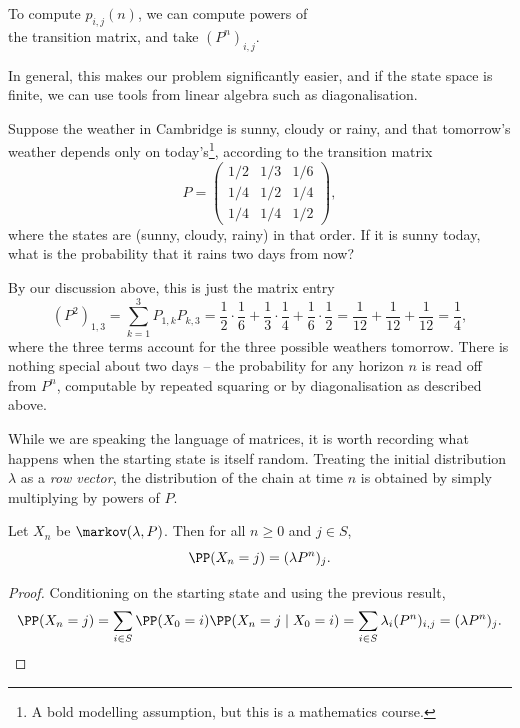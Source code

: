 \documentclass[a4paper]{scrartcl}
\begin{document}
\begin{center}
	\color{blue}
	To compute $p_{i, j}(n)$, we can compute powers of\\ the transition matrix, and take $(P^n)_{i, j}$.
\end{center}

In general, this makes our problem significantly easier, and if the state space is finite, we can use tools from linear algebra such as diagonalisation.

\begin{example}
	Suppose the weather in Cambridge is sunny, cloudy or rainy, and that tomorrow's weather depends only on today's\footnote{A bold modelling assumption, but this is a mathematics course.}, according to the transition matrix
	$$
	P = \begin{pmatrix}
		1/2 & 1/3 & 1/6 \\
		1/4 & 1/2 & 1/4 \\
		1/4 & 1/4 & 1/2
	\end{pmatrix},
	$$
	where the states are (sunny, cloudy, rainy) in that order. If it is sunny today, what is the probability that it rains two days from now?

	By our discussion above, this is just the matrix entry
	$$
	(P^2)_{1, 3} = \sum_{k = 1}^{3} P_{1, k}P_{k, 3} = \frac{1}{2}\cdot\frac{1}{6} + \frac{1}{3}\cdot\frac{1}{4} + \frac{1}{6}\cdot\frac{1}{2} = \frac{1}{12} + \frac{1}{12} + \frac{1}{12} = \frac{1}{4},
	$$
	where the three terms account for the three possible weathers tomorrow. There is nothing special about two days -- the probability for any horizon $n$ is read off from $P^n$, computable by repeated squaring or by diagonalisation as described above.
\end{example}

While we are speaking the language of matrices, it is worth recording what happens when the starting state is itself random. Treating the initial distribution $\lambda$ as a \emph{row vector}, the distribution of the chain at time $n$ is obtained by simply multiplying by powers of $P$.

\begin{proposition}
	Let $X_n$ be $\markov(\lambda, P)$. Then for all $n \geq 0$ and $j \in S$,
	$$
	\PP(X_n = j) = (\lambda P^n)_j.
	$$
\end{proposition}
\begin{proof}
	Conditioning on the starting state and using the previous result,
	$$
	\PP(X_n = j) = \sum_{i \in S} \PP(X_0 = i)\PP(X_n = j \mid X_0 = i) = \sum_{i \in S} \lambda_i (P^n)_{i, j} = (\lambda P^n)_j. \qedhere
	$$
\end{proof}
\end{document}
